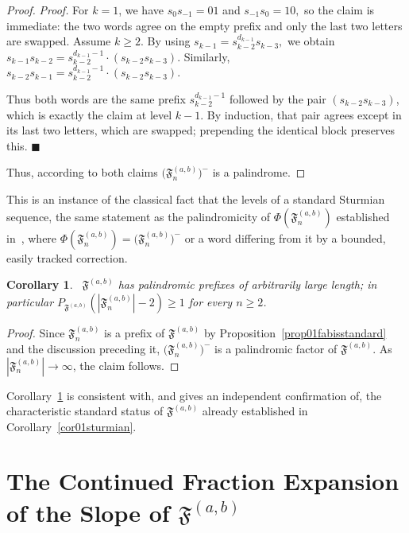 \documentclass[12pt]{amsart}
\theoremstyle{plain}
\newtheorem{corollary}[theorem]{Corollary}
\theoremstyle{definition}
\theoremstyle{remark}
\newcommand{\FD}{\mathfrak{F}}
\renewcommand{\qedsymbol}{$\blacksquare$}
\begin{document}
\begin{proof}
\noindent \textit{Proof.} 
For $k=1$, we have $s_0s_{-1}=01$ and $s_{-1}s_0=10,$ so the claim is immediate: the two words agree on the empty prefix and only the last two letters are swapped. Assume $k\geqslant 2$. By using $s_{k-1}=s_{k-2}^{d_{k-1}}s_{k-3},$
we obtain  $s_{k-1}s_{k-2}=s_{k-2}^{d_{k-1}-1}\cdot (s_{k-2}s_{k-3}).$
Similarly, $s_{k-2}s_{k-1}=s_{k-2}^{d_{k-1}-1}\cdot (s_{k-2}s_{k-3}).$ 

Thus both words are the same prefix $s_{k-2}^{d_{k-1}-1}$ followed by the pair $(s_{k-2}s_{k-3})$, which is exactly the claim at level $k-1$. By induction, that pair agrees except in its last two letters, which are swapped; prepending the identical block preserves this.
\hfill \qedsymbol 

Thus, according to both claims $\bigl(\FD^{(a,b)}_n\bigr)^{-}$ is
a palindrome.
\end{proof}

This is an instance of the classical fact that the levels of a standard
Sturmian sequence, the same statement as the palindromicity of
$\Phi(\FD^{(a,b)}_n)$ established in~\cite{Ramirez2015}, where 
$\Phi(\FD^{(a,b)}_n)=\bigl(\FD^{(a,b)}_n\bigr)^{-}$ or a word differing
from it by a bounded, easily tracked correction.  

\begin{corollary}~\label{cor002arbitrary}
$\FD^{(a,b)}$ has palindromic prefixes of arbitrarily large length; in
particular $P_{\FD^{(a,b)}}(|\FD^{(a,b)}_n|-2)\geqslant 1$ for every $n\geqslant 2$.
\end{corollary}
\begin{proof}
Since $\FD^{(a,b)}_n$ is a prefix of $\FD^{(a,b)}$ by Proposition~\ref{prop01fabisstandard} and the discussion preceding
it, $\bigl(\FD^{(a,b)}_n\bigr)^{-}$ is a palindromic factor of $\FD^{(a,b)}$. As $|\FD^{(a,b)}_n|\to\infty$, the claim follows.
\end{proof}

Corollary~\ref{cor002arbitrary} is consistent with,
and gives an independent confirmation of, the characteristic standard
status of $\FD^{(a,b)}$ already established in Corollary~\ref{cor01sturmian}.

\section{The Continued Fraction Expansion of the Slope of \texorpdfstring{$\FD^{(a,b)}$}{FD(a,b)}}\label{sec01continuedfraction}
\end{document}
